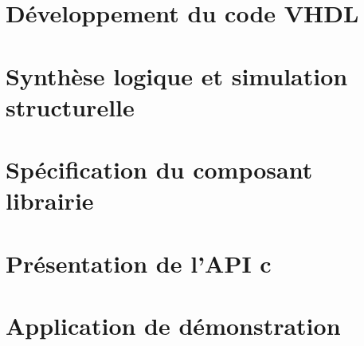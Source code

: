 \documentclass[a4paper, 11pt, svgnames]{report}
\begin{document}
    \chapter{Développement du code VHDL}





    \chapter{Synthèse logique et simulation structurelle}
    \chapter{Spécification du composant librairie}
    \chapter{Présentation de l'API c}
    \chapter{Application de démonstration}

    \begin{thebibliography}{99}
    \end{thebibliography}
\end{document}
